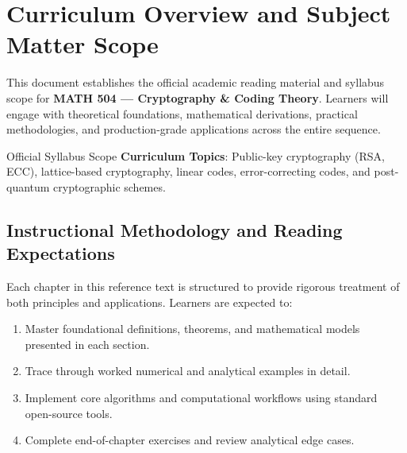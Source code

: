 \section{Curriculum Overview and Subject Matter Scope}

This document establishes the official academic reading material and syllabus scope for \textbf{MATH 504 --- Cryptography \& Coding Theory}. Learners will engage with theoretical foundations, mathematical derivations, practical methodologies, and production-grade applications across the entire sequence.

\begin{InsightBox}{Official Syllabus Scope}
  \textbf{Curriculum Topics}: Public-key cryptography (RSA, ECC), lattice-based cryptography, linear codes, error-correcting codes, and post-quantum cryptographic schemes.
\end{InsightBox}

\subsection{Instructional Methodology and Reading Expectations}

Each chapter in this reference text is structured to provide rigorous treatment of both principles and applications. Learners are expected to:
\begin{enumerate}
  \item Master foundational definitions, theorems, and mathematical models presented in each section.
  \item Trace through worked numerical and analytical examples in detail.
  \item Implement core algorithms and computational workflows using standard open-source tools.
  \item Complete end-of-chapter exercises and review analytical edge cases.
\end{enumerate}

